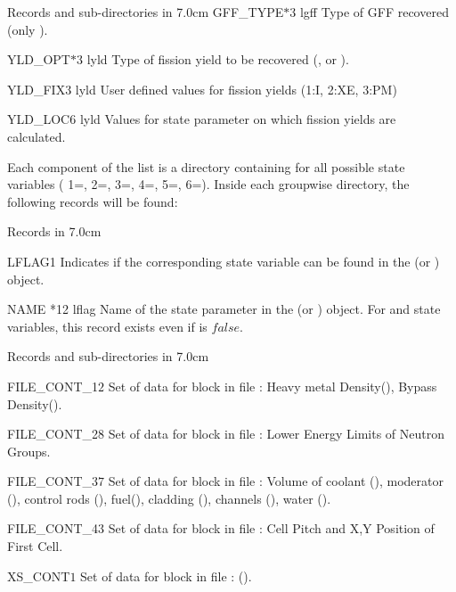 \begin{DescriptionEnregistrement}{Records and sub-directories
 in  }{7.0cm}
 \OptCharEnr
 {GFF\_TYPE}{$*3$} {lgff} {Type of GFF recovered (only ).}

 \OptCharEnr
 {YLD\_OPT}{$*3$} {lyld} {Type of fission yield to be recovered (, or ).}

 \OptRealEnr
 {YLD\_FIX}{$3$} {lyld} {} {User defined values for fission yields (1:I, 2:XE, 3:PM)}

  \OptRealEnr
 {YLD\_LOC}{$6$} {lyld} {} {Values for state parameter on which fission yields are calculated.}

 \end{DescriptionEnregistrement}
 
Each component of the list  is a directory containing for all possible state variables ( 1=, 2=, 3=, 4=, 5=, 6=). Inside each groupwise directory, the following records will be found:

 \begin{DescriptionEnregistrement}{Records in  }{7.0cm} \label{tabl:tabPK}
 
 \IntEnr
 {LFLAG}{1}
 {Indicates if the corresponding state variable can be found in the  (or ) object.}
  
  \OptCharEnr
 {NAME} {*12} {lflag} 
 {Name of the state parameter in the  (or ) object. For  and  state variables, this record exists even if  is $\textit{false}$. }  
 
   
 \end{DescriptionEnregistrement} 
 


\begin{DescriptionEnregistrement}{Records and sub-directories
 in  }{7.0cm} \label{tabl:tabhel}

\RealEnr
 {FILE\_CONT\_1}{$2$}{ }
 {Set of data for  block in  file : Heavy metal Density(), Bypass Density(). } 
  
\RealEnr
 {FILE\_CONT\_2}{$8$}{ }
 {Set of data for  block in  file : Lower Energy Limits of Neutron Groups. } 
  
\RealEnr
 {FILE\_CONT\_3}{$7$}{ }
 {Set of data for  block in  file : Volume of coolant (), moderator (), control rods (), fuel(), cladding (), channels (), water (). }
 
 \RealEnr
 {FILE\_CONT\_4}{$3$}{ }
 {Set of data for  block in  file : Cell Pitch and X,Y Position of First Cell. }
 
  \RealEnr
 {XS\_CONT}{$1$}{ }
 {Set of data for  block in  file :  (). }
    
 \end{DescriptionEnregistrement}
 
